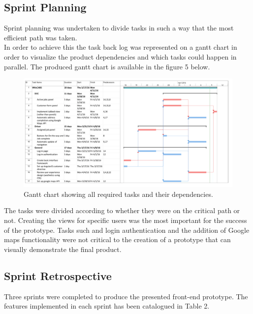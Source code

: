 \documentclass[12pt]{article}
\begin{document}
\subsection{Sprint Planning}
Sprint planning was undertaken to divide tasks in such a way that the most efficient path was taken.\\

In order to achieve this the task back log was represented on a gantt chart in order to visualize the product dependencies and which tasks could happen in parallel. The produced gantt chart is available in the figure 5 below.\\

\begin{figure}[ht]
\centering
\label{gantt}
\includegraphics[width=1\textwidth]{gantt.png}
\caption{Gantt chart showing all required tasks and their dependencies.}
\end{figure}

The tasks were divided according to whether they were on the critical path or not. Creating the views for specific users was the most important for the success of the prototype. Tasks such and login authentication and the addition of Google maps functionality were not critical to the creation of a prototype that can visually demonstrate the final product.
\subsection{Sprint Retrospective}
Three sprints were completed to produce the presented front-end prototype. The features implemented in each sprint has been catalogued in Table 2.\\
\end{document}
